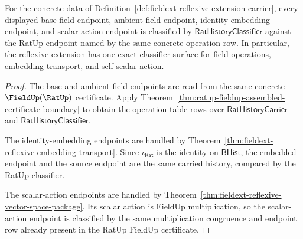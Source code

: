 \begin{theorem}
\label{thm:fieldext-reflexive-exact-endpoint-classification}
For the concrete data of
Definition~\ref{def:fieldext-reflexive-extension-carrier}, every displayed
base-field endpoint, ambient-field endpoint, identity-embedding endpoint,
and scalar-action endpoint is classified by
$\mathsf{RatHistoryClassifier}$ against the RatUp endpoint named by the
same concrete operation row. In particular, the reflexive extension has one
exact classifier surface for field operations, embedding transport, and
self scalar action.
\end{theorem}
\begin{proof}
The base and ambient field endpoints are read from the same concrete
$\FieldUp(\RatUp)$ certificate. Apply
Theorem~\ref{thm:ratup-fieldup-assembled-certificate-boundary} to obtain the
operation-table rows over $\mathsf{RatHistoryCarrier}$ and
$\mathsf{RatHistoryClassifier}$.

The identity-embedding endpoints are handled by
Theorem~\ref{thm:fieldext-reflexive-embedding-transport}. Since
$\iota_{\mathsf{Rat}}$ is the identity on $\mathsf{BHist}$, the embedded
endpoint and the source endpoint are the same carried history, compared by
the RatUp classifier.

The scalar-action endpoints are handled by
Theorem~\ref{thm:fieldext-reflexive-vector-space-package}. Its scalar action
is FieldUp multiplication, so the scalar-action endpoint is classified by
the same multiplication congruence and endpoint row already present in the
RatUp FieldUp certificate.
\end{proof}

